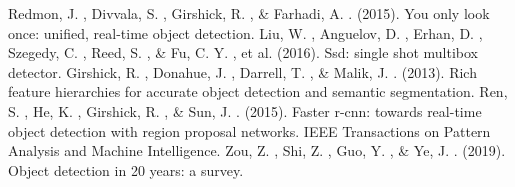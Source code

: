 \documentclass[journal,transmag]{IEEEtran}
\begin{document}
%
%
%
\begin{thebibliography}{1}
Redmon, J. , Divvala, S. , Girshick, R. , \& Farhadi, A. . (2015). You only look once: unified, real-time object detection.
Liu, W. , Anguelov, D. , Erhan, D. , Szegedy, C. , Reed, S. , \& Fu, C. Y. , et al. (2016). Ssd: single shot multibox detector.
Girshick, R. , Donahue, J. , Darrell, T. , \& Malik, J. . (2013). Rich feature hierarchies for accurate object detection and semantic segmentation.
Ren, S. , He, K. , Girshick, R. , \& Sun, J. . (2015). Faster r-cnn: towards real-time object detection with region proposal networks. IEEE Transactions on Pattern Analysis and Machine Intelligence.
Zou, Z. , Shi, Z. , Guo, Y. , \& Ye, J. . (2019). Object detection in 20 years: a survey.
\end{thebibliography}

% 


\end{document}

